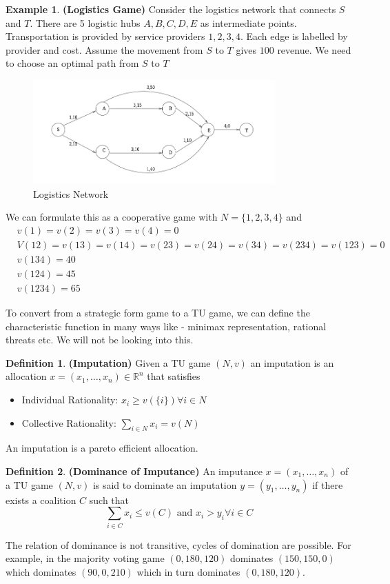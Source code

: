 \documentclass{article}
\theoremstyle{definition}
\newtheorem{defn}{Definition}[section]
\newtheorem{example}{Example}[section]
\begin{document}
\begin{example}
\textbf{(Logistics Game)} Consider the logistics network that connects $S$ and $T$. There are 5 logistic hubs $A,B,C,D,E$ as intermediate points. Transportation is provided by service providers $1,2,3,4$. Each edge is labelled by provider and cost. Assume the movement from $S$ to $T$ gives $100$ revenue. We need to choose an optimal path from $S$ to $T$
\begin{figure}[H]
	\centering\includegraphics[height = 4cm]{images/Fig2.png}
	\caption{Logistics Network}
\end{figure}
We can formulate this as a cooperative game with $N = \{1,2,3,4\}$ and 
\begin{align*}
&v(1) = v(2) = v(3) = v(4) = 0\\
&V(12) = v(13) = v(14) = v(23) = v(24) = v(34) = v(234) = v(123) = 0\\
& v(134) = 40\\
& v(124) = 45\\
&v(1234) = 65
\end{align*}
\end{example}
To convert from a strategic form game to a TU game, we can define the characteristic function in many ways like - minimax representation, rational threats etc. We will not be looking into this.
\begin{defn}
\textbf{(Imputation)} Given a TU game $(N,v)$ an imputation is an allocation $x = (x_1,\dots,x_n) \in \mathbb{R}^n$ that satisfies 
\begin{itemize}
	\item Individual Rationality: $x_i \geq v(\{i\}) \forall i \in N$
	\item Collective Rationality: $\sum_{i\in N} x_i =  v(N)$
\end{itemize}
\end{defn}
An imputation is a pareto efficient allocation.
\begin{defn}
\textbf{(Dominance of Imputance)} An imputance $x = (x_1,\dots,x_n)$ of a TU game $(N,v)$ is said to dominate an imputation $y = (y_1,\dots,y_n)$ if there exists a coalition $C$ such that $$\sum_{i\in C} x_i \leq v(C) \text{ and } x_i>y_i \forall i \in C$$
\end{defn}
The relation of dominance is not transitive, cycles of domination are possible. For example, in the majority voting game $(0,180,120)$ dominates $(150,150,0)$ which dominates $(90,0,210)$ which in turn dominates $(0,180,120)$.
\end{document}
